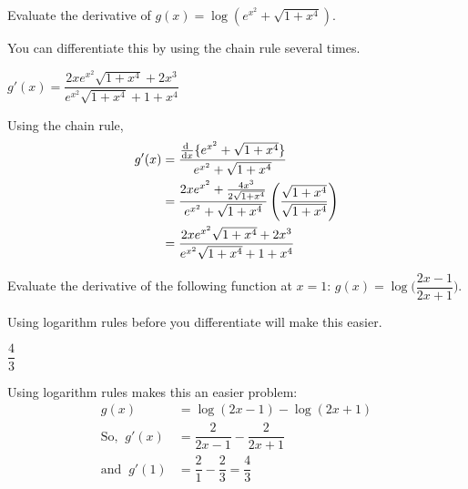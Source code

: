 \begin{question}[1998H]
Evaluate the derivative of  $g(x)=\log (e^{x^2}+\sqrt{1+x^4})$.
\end{question}
\begin{hint} You can differentiate this by using the chain rule several times.
\end{hint}
\begin{answer}
$g'(x)=\dfrac{2xe^{x^2}\sqrt{1+x^4}+2x^3}{e^{x^2}\sqrt{1+x^4}+1+x^4}$
\end{answer}
\begin{solution}
Using the chain rule,
\begin{align*}
g'(x)&=\frac{\diff{}{x}\{e^{x^2}+\sqrt{1+x^4}\}}{e^{x^2}+\sqrt{1+x^4}}\\
&=\frac{2xe^{x^2}+\frac{4x^3}{2\sqrt{1+x^4}}}{e^{x^2}+\sqrt{1+x^4}}\left(\frac{\sqrt{1+x^4}}{\sqrt{1+x^4}}\right)\\
&=\frac{2xe^{x^2}\sqrt{1+x^4}+2x^3}{e^{x^2}\sqrt{1+x^4}+1+x^4}
\end{align*}
\end{solution}



\begin{question}[1997D]Evaluate the derivative of the following function at $x=1$:
$g(x)=\log\Big(\dfrac{2x-1}{2x+1}\Big)$.
\end{question}
\begin{hint}  Using logarithm rules before you differentiate will make this easier.
\end{hint}
\begin{answer} $\dfrac{4}{3}$
\end{answer}
\begin{solution}
Using logarithm rules makes this an easier problem:
\begin{align*}
g(x) &= \log(2x-1) -\log(2x+1)\\
\mbox{So, }~
g'(x) &= \dfrac{2}{2x-1} -\dfrac{2}{2x+1}\\
\mbox{and }~
g'(1) &= \dfrac{2}{1} -\dfrac{2}{3}=\dfrac{4}{3}
\end{align*}
\end{solution}


